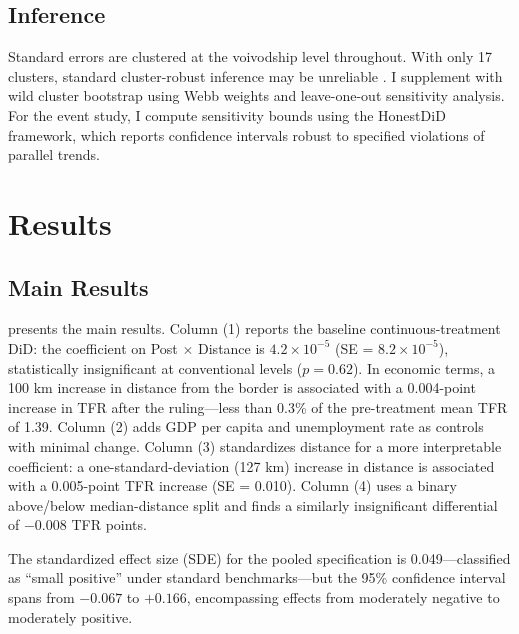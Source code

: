 \documentclass[12pt]{article}
\begin{document}
\subsection{Inference}

Standard errors are clustered at the voivodship level throughout. With only 17 clusters, standard cluster-robust inference may be unreliable \citep{cameron2015}. I supplement with wild cluster bootstrap using Webb weights \citep{mackinnon2023} and leave-one-out sensitivity analysis. For the event study, I compute \citet{rambachan2023} sensitivity bounds using the HonestDiD framework, which reports confidence intervals robust to specified violations of parallel trends.


\section{Results}
\label{sec:results}

\subsection{Main Results}

 presents the main results. Column (1) reports the baseline continuous-treatment DiD: the coefficient on Post $\times$ Distance is $4.2 \times 10^{-5}$ (SE = $8.2 \times 10^{-5}$), statistically insignificant at conventional levels ($p = 0.62$). In economic terms, a 100 km increase in distance from the border is associated with a 0.004-point increase in TFR after the ruling---less than 0.3\% of the pre-treatment mean TFR of 1.39. Column (2) adds GDP per capita and unemployment rate as controls with minimal change. Column (3) standardizes distance for a more interpretable coefficient: a one-standard-deviation (127 km) increase in distance is associated with a 0.005-point TFR increase (SE = 0.010). Column (4) uses a binary above/below median-distance split and finds a similarly insignificant differential of $-0.008$ TFR points.

The standardized effect size (SDE) for the pooled specification is 0.049---classified as ``small positive'' under standard benchmarks---but the 95\% confidence interval spans from $-0.067$ to $+0.166$, encompassing effects from moderately negative to moderately positive.
\end{document}
